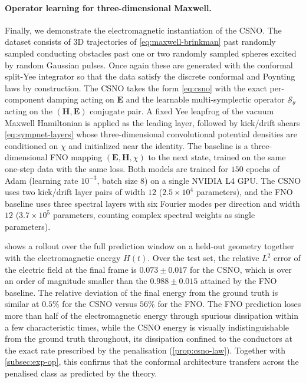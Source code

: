 \documentclass[11pt]{article}
\theoremstyle{definition}
\theoremstyle{remark}
\newcommand{\bE}{\bm{E}}
\newcommand{\bH}{\bm{H}}
\newcommand{\So}{\mathcal{S}}
\begin{document}
\paragraph{Operator learning for three-dimensional Maxwell.}
Finally, we demonstrate the electromagnetic instantiation of the CSNO.  The dataset consists of 3D trajectories of \eqref{eq:maxwell-brinkman} past randomly sampled conducting obstacles past one or two randomly sampled spheres
excited by random Gaussian pulses. Once again these are generated with the conformal split-Yee integrator so that the data satisfy the discrete conformal and Poynting laws by construction. The CSNO takes the form \eqref{eq:csno} with the exact per-component
damping acting on $\bE$ and the learnable multi-symplectic operator
$\So_\theta$ acting on the $(\bH,\bE)$ conjugate pair. A fixed
Yee leapfrog of the vacuum Maxwell Hamiltonian is applied as the
leading layer, followed by kick/drift shears
\eqref{eq:sympnet-layers} whose three-dimensional convolutional
potential densities are conditioned on $\chi$ and initialized near
the identity.  The baseline is a three-dimensional FNO mapping
$(\bE,\bH,\chi)$ to the next state, trained on the same one-step data
with the same loss.  
Both models are trained for $150$ epochs of Adam (learning rate $10^{-3}$, batch size $8$) on a single NVIDIA L4 GPU. The CSNO uses two
kick/drift layer pairs of width $12$ ($2.5\times10^4$ parameters), and the FNO baseline uses three spectral layers with six Fourier modes per direction and width $12$ ($3.7\times10^5$ parameters, counting complex spectral weights as single parameters).

 shows a rollout over the full prediction
window on a held-out geometry together with the electromagnetic
energy $H(t)$.  Over the test set, the relative $L^2$ error of the
electric field at the final frame is $0.073\pm0.017$ for the CSNO, which is over an order of magnitude smaller than the $0.988\pm0.015$ attained by the FNO baseline. The relative deviation of the final
energy from the ground truth is similar at $0.5\%$ for the CSNO versus $56\%$ for the FNO. The FNO prediction loses more than half of the electromagnetic energy through
spurious dissipation within a few characteristic times, while the
CSNO energy is visually indistinguishable from the ground truth
throughout, its dissipation confined to the conductors at the exact
rate prescribed by the penalisation
(\cref{prop:csno-law}).  Together with \cref{subsec:exp-op}, this
confirms that the conformal architecture transfers across the
penalised class as predicted by the theory.
\end{document}
